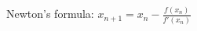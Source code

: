 \documentclass[preview]{standalone}
\begin{document}
\begin{center}
Newton's formula: $x_{n+1} = x_n -\frac{f(x_n)}{f'(x_n)}$
\end{center}
\end{document}
